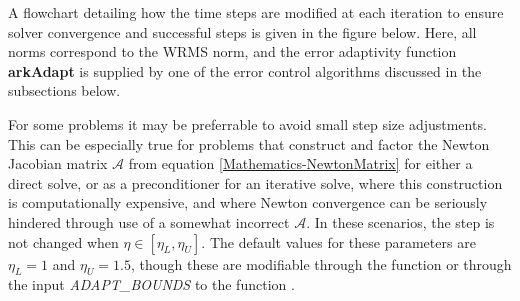 \documentclass[letterpaper,10pt,english]{sphinxmanual}
\begin{document}
A flowchart detailing how the time steps are modified at each
iteration to ensure solver convergence and successful steps is given
in the figure below.  Here, all norms correspond to the WRMS norm, and
the error adaptivity function \textbf{arkAdapt} is supplied by one of the
error control algorithms discussed in the subsections below.
\begin{figure}[htbp]
\centering

\label{Mathematics:adaptivity-figure}\end{figure}

For some problems it may be preferrable to avoid small step size
adjustments.  This can be especially true for problems that construct
and factor the Newton Jacobian matrix ${\mathcal A}$ from
equation \eqref{Mathematics-NewtonMatrix} for either a direct solve, or as a
preconditioner for an iterative solve, where this construction is
computationally expensive, and where Newton convergence can be
seriously hindered through use of a somewhat incorrect
${\mathcal A}$.  In these scenarios, the step is not changed
when $\eta \in [\eta_L, \eta_U]$.  The default values for these
parameters are $\eta_L = 1$ and $\eta_U = 1.5$, though
these are modifiable through the function
{\hyperref[c_interface/User_callable:ARKodeSetFixedStepBounds]{}} or through the input
\emph{ADAPT\_BOUNDS} to the function {\hyperref[f_interface/Usage:f/_/FARKSETRIN]{}}.
\end{document}

